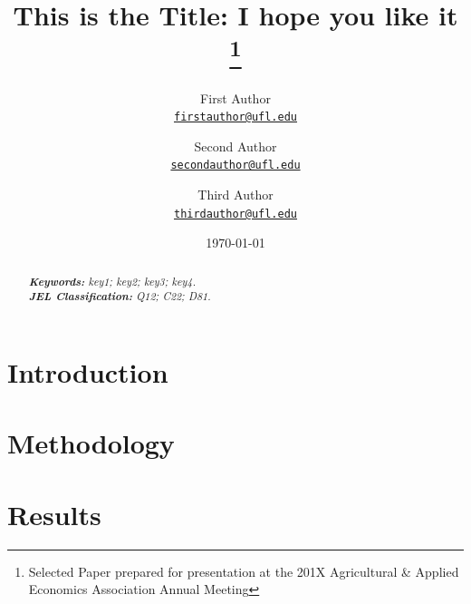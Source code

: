 \documentclass[11pt]{article}
\title{This is the Title: I hope you like it
\thanks{Selected Paper prepared for presentation at the 201X Agricultural \& Applied Economics Association Annual Meeting}
}
\author{First Author\\%
    \href{mailto:firstauthor@ufl.edu}{\texttt{firstauthor@ufl.edu}} %
\and Second Author\\%
    \href{mailto:secondauthor@ufl.edu}{\texttt{secondauthor@ufl.edu}} %
\and Third Author\\%
    \href{mailto:thirdauthor@ufl.edu}{\texttt{thirdauthor@ufl.edu}}%
    }
\date{\today}
\begin{document}
{
\maketitle
\begin{abstract}

    \lipsum[1] %

    \noindent
    \textit{\textbf{Keywords: }%
        key1; key2; key3; key4.} \\ %
    \noindent
    \textit{\textbf{JEL Classification: }%
        Q12; C22; D81.} %

\end{abstract}
}


\section{Introduction}

\lipsum[2-5] %
\citet{Hardaker2004} %

\section{Methodology}

\lipsum[7-9] %
\citep{Chavas2015} %

\section{Results}

\lipsum[12-13] %
\end{document}
